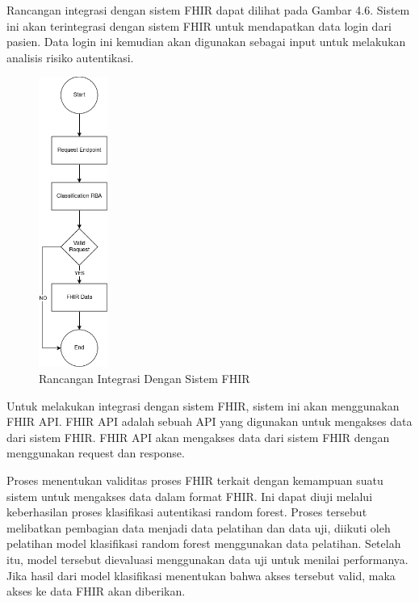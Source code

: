 Rancangan integrasi dengan sistem FHIR dapat dilihat pada Gambar 4.6. Sistem ini akan terintegrasi dengan sistem FHIR untuk mendapatkan data login dari pasien. Data login ini kemudian akan digunakan sebagai input untuk melakukan analisis risiko autentikasi.
\begin{figure}[H]
    \centering
    \includegraphics[width=0.2\textwidth]{BAB_TESIS/IMAGES/fhir_rba.drawio.png}
    \caption{Rancangan Integrasi Dengan Sistem FHIR}
    \label{fig:integrasi}
\end{figure}

Untuk melakukan integrasi dengan sistem FHIR, sistem ini akan menggunakan FHIR API. FHIR API adalah sebuah API yang digunakan untuk mengakses data dari sistem FHIR. FHIR API akan mengakses data dari sistem FHIR dengan menggunakan request dan response. 

Proses menentukan validitas proses FHIR terkait dengan kemampuan suatu sistem untuk mengakses data dalam format FHIR. Ini dapat diuji melalui keberhasilan proses klasifikasi autentikasi random forest. Proses tersebut melibatkan pembagian data menjadi data pelatihan dan data uji, diikuti oleh pelatihan model klasifikasi random forest menggunakan data pelatihan. Setelah itu, model tersebut dievaluasi menggunakan data uji untuk menilai performanya. Jika hasil dari model klasifikasi menentukan bahwa akses tersebut valid, maka akses ke data FHIR akan diberikan.